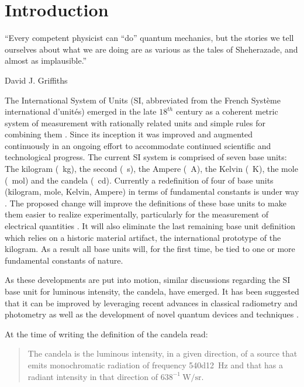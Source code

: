 

\chapter{Introduction}	\label{ch::introduction}

		\epigraph{``Every competent physicist can \enquote{do} quantum mechanics, but the stories we tell ourselves about what we are doing are as various as the tales of Sheherazade, and almost as implausible.''}{\textup{David J. Griffiths}}

		The International System of Units (SI, abbreviated from the French Syst\`eme international d'unit\'es) emerged in the late $18^{th}$ century as a coherent metric system of measurement with rationally related units and simple rules for combining them \cite{zwinckels::1}. Since its inception it was improved and augmented continuously in an ongoing effort to accommodate continued scientific and technological progress. The current SI system is comprised of seven base units: The kilogram (\SI{}{\kg}), the second (\SI{}{\s}), the Ampere (\SI{}{\ampere}), the Kelvin (\SI{}{\kelvin}), the mole (\SI{}{\mole}) and the candela (\SI{}{\candela}). Currently a redefinition of four of base units (kilogram, mole, Kelvin, Ampere) in terms of fundamental constants is under way \cite{zwinckels::3, Milton, Martin (14 November 2016). Highlights in the work of the BIPM in 2016}. The proposed change will improve the definitions of these base units to make them easier to realize experimentally, particularly for the measurement of electrical quantities \cite{zwinckels::paper}. It will also eliminate the last remaining base unit definition which relies on a historic material artifact, the international prototype of the kilogram. As a result all base units will, for the first time, be tied to one or more fundamental constants of nature.

		As these developments are put into motion, similar discussions regarding the SI base unit for luminous intensity, the candela, have emerged. It has been suggested that it can be improved by leveraging recent advances in classical radiometry and photometry as well as the development of novel quantum devices and techniques \cite{Cheung2007}.

		At the time of writing the definition of the candela read:

		\begin{quote}
			The candela is the luminous intensity, in a given direction, of a source that emits monochromatic radiation of frequency \SI{540d12}{\hertz} and that has a radiant intensity in that direction of $638^{-1} \SI{}{\watt\per\steradian}$.
		\end{quote}

